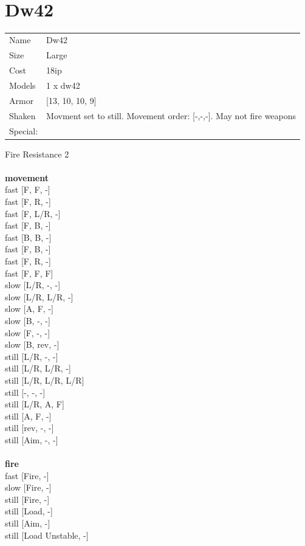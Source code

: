  
\ \\













\clearpage

\section{ Dw42 }

\begin{tabular}{ll}
  Name & Dw42 \\
  Size & Large\\
  Cost & 18ip\\
  Models & 1 x dw42\\
  Armor & [13, 10, 10, 9]\\
  Shaken & Movment set to still. Movement order: [-,-,-]. May not fire weapons\\
  Special: \\
\end{tabular}

\noindent Fire Resistance 2\\ 


\ \\ {\bf movement } \\
fast [F, F, -] \\
fast [F, R, -] \\
fast [F, L/R, -] \\
fast [F, B, -] \\
fast [B, B, -] \\
fast [F, B, -] \\
fast [F, R, -] \\
fast [F, F, F] \\
slow [L/R, -, -] \\
slow [L/R, L/R, -] \\
slow [A, F, -] \\
slow [B, -, -] \\
slow [F, -, -] \\
slow [B, rev, -] \\
still [L/R, -, -] \\
still [L/R, L/R, -] \\
still [L/R, L/R, L/R] \\
still [-, -, -] \\
still [L/R, A, F] \\
still [A, F, -] \\
still [rev, -, -] \\
still [Aim, -, -] \\
\ \\ {\bf fire } \\
fast [Fire, -] \\
slow [Fire, -] \\
still [Fire, -] \\
still [Load, -] \\
still [Aim, -] \\
still [Load Unstable, -] \\


